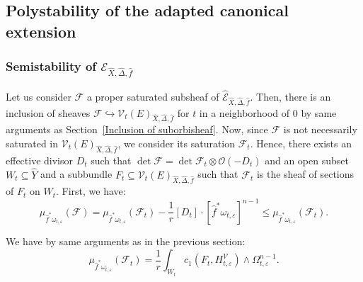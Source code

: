 \documentclass[12pt,a4paper]{amsart}
\theoremstyle{plain}
\theoremstyle{definition}
\begin{document}
\subsection{Polystability of the adapted canonical extension}

\subsubsection{Semistability of $\mathcal{E}_{\widehat{X}, \widehat{\Delta}, \widehat{f}}$}
Let us consider $\mathcal{F}$ a proper saturated subsheaf of $\widehat{\mathcal{E}}_{\widehat{X}, \widehat{\Delta}, \widehat{f}}$. Then, there is an inclusion of sheaves $\mathcal{F} \hookrightarrow \mathcal{V}_t(E)_{ \widehat{X}, \widehat{\Delta}, \widehat{f}}$ for $t$ in a neighborhood of $0$ by same arguments as Section~\ref{Inclusion of suborbisheaf}. Now, since $\mathcal{F}$ is not necessarily saturated in $\mathcal{V}_t(E)_{ \widehat{X}, \widehat{\Delta}, \widehat{f}}$, we consider its saturation $\mathcal{F}_t$. Hence, there exists an effective divisor $D_t$ such that $\det \mathcal{F} = \det \mathcal{F}_t \otimes \mathcal{O}(-D_t)$ and an open subset $W_t \subseteq \widehat{Y}$ and a subbundle $F_t \subseteq \mathcal{V}_t(E)_{\widehat{X}, \widehat{\Delta}, \widehat{f}}$ such that $\mathcal{F}_t$ is the sheaf of sections of $F_t$ on $W_t$.
First, we have:
$$
    \mu_{\widehat{f}^*\omega_{t, \varepsilon}}(\mathcal{F}) = \mu_{\widehat{f}^*\omega_{t, \varepsilon}}(\mathcal{F}_t) - \frac{1}{r} \left[ D_t \right] \cdot \left[ \widehat{f}^*\omega_{t, \varepsilon}  \right]^{n-1} \leq \mu_{\widehat{f}^*\omega_{t, \varepsilon}}(\mathcal{F}_t).
$$

We have by same arguments as in the previous section:
$$
    \mu_{\widehat{f}^*\omega_{t, \varepsilon}}(\mathcal{F}_t) = \frac{1}{r} \int_{W_t} c_1(F_t, H^{\mathcal{V}}_{t, \varepsilon}) \wedge \Omega_{t, \varepsilon}^{n-1}.
$$
\end{document}
